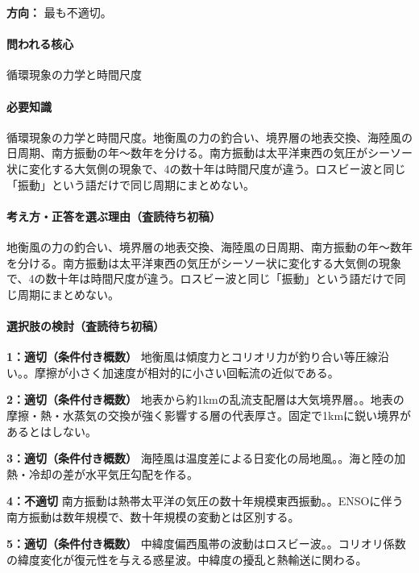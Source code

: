 \noindent\textbf{方向：} 最も不適切。\par

\paragraph{問われる核心} 循環現象の力学と時間尺度

\paragraph{必要知識} 循環現象の力学と時間尺度。地衡風の力の釣合い、境界層の地表交換、海陸風の日周期、南方振動の年〜数年を分ける。南方振動は太平洋東西の気圧がシーソー状に変化する大気側の現象で、4の数十年は時間尺度が違う。ロスビー波と同じ「振動」という語だけで同じ周期にまとめない。

\paragraph{考え方・正答を選ぶ理由（査読待ち初稿）} 地衡風の力の釣合い、境界層の地表交換、海陸風の日周期、南方振動の年〜数年を分ける。南方振動は太平洋東西の気圧がシーソー状に変化する大気側の現象で、4の数十年は時間尺度が違う。ロスビー波と同じ「振動」という語だけで同じ周期にまとめない。

\paragraph{選択肢の検討（査読待ち初稿）}\mbox{}\par

\noindent\textbf{1：適切（条件付き概数）} 地衡風は傾度力とコリオリ力が釣り合い等圧線沿い。。摩擦が小さく加速度が相対的に小さい回転流の近似である。\par

\noindent\textbf{2：適切（条件付き概数）} 地表から約1kmの乱流支配層は大気境界層。。地表の摩擦・熱・水蒸気の交換が強く影響する層の代表厚さ。固定で1kmに鋭い境界があるとはしない。\par

\noindent\textbf{3：適切（条件付き概数）} 海陸風は温度差による日変化の局地風。。海と陸の加熱・冷却の差が水平気圧勾配を作る。\par

\noindent\textbf{4：不適切} 南方振動は熱帯太平洋の気圧の数十年規模東西振動。。ENSOに伴う南方振動は数年規模で、数十年規模の変動とは区別する。\par

\noindent\textbf{5：適切（条件付き概数）} 中緯度偏西風帯の波動はロスビー波。。コリオリ係数の緯度変化が復元性を与える惑星波。中緯度の擾乱と熱輸送に関わる。\par

